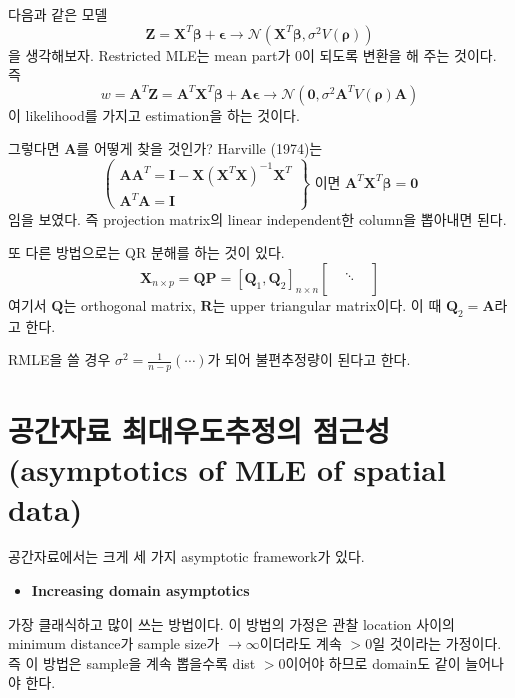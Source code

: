 \documentclass[b5paper,]{scrbook}
\providecommand{\tightlist}{%
  \setlength{\itemsep}{0pt}\setlength{\parskip}{0pt}}
\theoremstyle{plain}
\theoremstyle{definition}
\numberwithin{equation}{section}
\begin{document}
다음과 같은 모델
\[\mathbf{Z}=\mathbf{X}^{T}\boldsymbol{\beta}+\boldsymbol{\epsilon} \rightarrow \mathcal{N}(\mathbf{X}^{T}\boldsymbol{\beta}, \sigma^{2}V(\boldsymbol{\rho}))\]
을 생각해보자. Restricted MLE는 mean part가 0이 되도록 변환을 해 주는 것이다. 즉
\[w=\mathbf{A}^{T}\mathbf{Z}=\mathbf{A}^{T}\mathbf{X}^{T}\boldsymbol{\beta}+\mathbf{A}\boldsymbol{\epsilon} \rightarrow \mathcal{N}(\mathbf{0},\sigma^{2}\mathbf{A}^{T}V(\boldsymbol{\rho})\mathbf{A})\]
이 likelihood를 가지고 estimation을 하는 것이다.

그렇다면 \(\mathbf{A}\)를 어떻게 찾을 것인가? Harville (1974)는
\[
\left(\begin{array}{l}
\mathbf{A}\mathbf{A}^{T}=\mathbf{I}-\mathbf{X}(\mathbf{X}^{T}\mathbf{X})^{-1}\mathbf{X}^{T}\\
\mathbf{A}^{T}\mathbf{A}=\mathbf{I}
\end{array}
\right\} \text{ 이면 } \mathbf{A}^{T}\mathbf{X}^{T}\boldsymbol{\beta}=\mathbf{0}
\]
임을 보였다. 즉 projection matrix의 linear independent한 column을 뽑아내면 된다.

또 다른 방법으로는 QR 분해를 하는 것이 있다.
\[
\mathbf{X}_{n\times p}=\mathbf{Q}\mathbf{P}=[\mathbf{Q}_{1}, \mathbf{Q}_{2}]_{n\times n}
\begin{bmatrix}
 &  &  \\
 & \ddots &  \\
 &  & \\
\end{bmatrix}
\]
여기서 \(\mathbf{Q}\)는 orthogonal matrix, \(\mathbf{R}\)는 upper triangular matrix이다. 이 때 \(\mathbf{Q}_{2}=\mathbf{A}\)라고 한다.

RMLE을 쓸 경우 \(\sigma^{2}=\frac{1}{n-p}( \cdots )\)가 되어 불편추정량이 된다고 한다.

\hypertarget{--asymptotics-of-mle-of-spatial-data}{%
\section{공간자료 최대우도추정의 점근성(asymptotics of MLE of spatial data)}\label{--asymptotics-of-mle-of-spatial-data}}

공간자료에서는 크게 세 가지 asymptotic framework가 있다.

\begin{itemize}
\tightlist
\item
  \textbf{Increasing domain asymptotics}
\end{itemize}

가장 클래식하고 많이 쓰는 방법이다. 이 방법의 가정은 관찰 location 사이의 minimum distance가 sample size가 \(\rightarrow \infty\)이더라도 계속 \(>0\)일 것이라는 가정이다. 즉 이 방법은 sample을 계속 뽑을수록 dist \(>0\)이어야 하므로 domain도 같이 늘어나야 한다.
\end{document}
